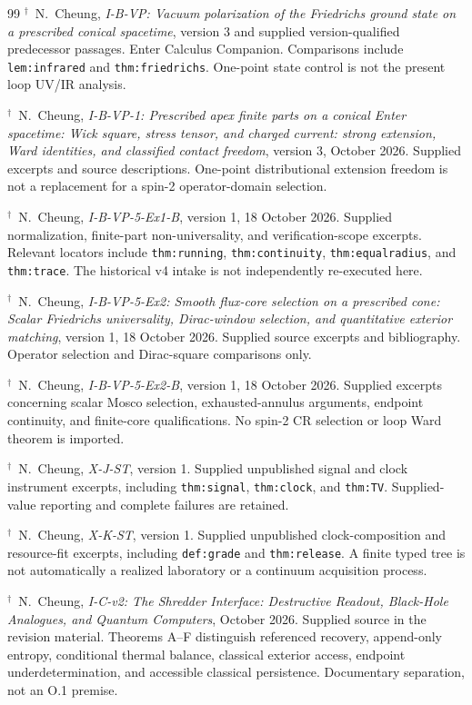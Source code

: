 \documentclass[11pt,a4paper]{article}
\newcommand{\loc}[1]{\nolinkurl{#1}}
\theoremstyle{plain}
\theoremstyle{definition}
\theoremstyle{remark}
\numberwithin{equation}{section}
\begin{document}
\begin{thebibliography}{99}
\(^{\dagger}\)\ N.~Cheung,
\emph{I-B-VP: Vacuum polarization of the Friedrichs ground state
on a prescribed conical spacetime},
version 3 and supplied version-qualified predecessor passages.
Enter Calculus Companion.
Comparisons include \loc{lem:infrared} and
\loc{thm:friedrichs}.
One-point state control is not the present loop UV/IR analysis.

\(^{\dagger}\)\ N.~Cheung,
\emph{I-B-VP-1: Prescribed apex finite parts on a conical Enter
spacetime: Wick square, stress tensor, and charged current:
strong extension, Ward identities, and classified contact freedom},
version 3, October 2026.
Supplied excerpts and source descriptions.
One-point distributional extension freedom is not a replacement
for a spin-2 operator-domain selection.

\(^{\dagger}\)\ N.~Cheung,
\emph{I-B-VP-5-Ex1-B},
version 1, 18 October 2026.
Supplied normalization, finite-part non-universality, and
verification-scope excerpts.
Relevant locators include
\loc{thm:running}, \loc{thm:continuity},
\loc{thm:equalradius}, and \loc{thm:trace}.
The historical v4 intake is not independently re-executed here.

\(^{\dagger}\)\ N.~Cheung,
\emph{I-B-VP-5-Ex2:
Smooth flux-core selection on a prescribed cone:
Scalar Friedrichs universality, Dirac-window selection,
and quantitative exterior matching},
version 1, 18 October 2026.
Supplied source excerpts and bibliography.
Operator selection and Dirac-square comparisons only.

\(^{\dagger}\)\ N.~Cheung,
\emph{I-B-VP-5-Ex2-B},
version 1, 18 October 2026.
Supplied excerpts concerning scalar Mosco selection,
exhausted-annulus arguments, endpoint continuity,
and finite-core qualifications.
No spin-2 CR selection or loop Ward theorem is imported.

\(^{\dagger}\)\ N.~Cheung,
\emph{X-J-ST},
version 1.
Supplied unpublished signal and clock instrument excerpts,
including \loc{thm:signal}, \loc{thm:clock},
and \loc{thm:TV}.
Supplied-value reporting and complete failures are retained.

\(^{\dagger}\)\ N.~Cheung,
\emph{X-K-ST},
version 1.
Supplied unpublished clock-composition and resource-fit excerpts,
including \loc{def:grade} and \loc{thm:release}.
A finite typed tree is not automatically a realized laboratory
or a continuum acquisition process.

\(^{\dagger}\)\ N.~Cheung,
\emph{I-C-v2: The Shredder Interface:
Destructive Readout, Black-Hole Analogues, and Quantum Computers},
October 2026.
Supplied source in the revision material.
Theorems A--F distinguish referenced recovery, append-only
entropy, conditional thermal balance, classical exterior access,
endpoint underdetermination, and accessible classical persistence.
Documentary separation, not an O.1 premise.


\end{thebibliography}
\end{document}
